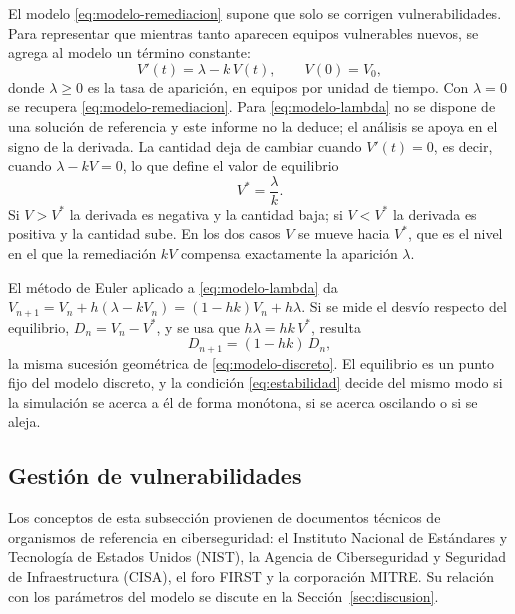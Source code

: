 El modelo \eqref{eq:modelo-remediacion} supone que solo se corrigen vulnerabilidades. Para
representar que mientras tanto aparecen equipos vulnerables nuevos, se agrega al modelo un
término constante:
\begin{equation}
  V'(t) = \lambda - k\, V(t), \qquad V(0) = V_0 ,
  \label{eq:modelo-lambda}
\end{equation}
donde $\lambda \ge 0$ es la tasa de aparición, en equipos por unidad de tiempo. Con
$\lambda = 0$ se recupera \eqref{eq:modelo-remediacion}. Para \eqref{eq:modelo-lambda} no se
dispone de una solución de referencia y este informe no la deduce; el análisis se apoya en
el signo de la derivada. La cantidad deja de cambiar cuando $V'(t) = 0$, es decir, cuando
$\lambda - kV = 0$, lo que define el valor de equilibrio
\begin{equation}
  V^{*} = \frac{\lambda}{k} .
  \label{eq:equilibrio}
\end{equation}
Si $V > V^{*}$ la derivada es negativa y la cantidad baja; si $V < V^{*}$ la derivada es positiva
y la cantidad sube. En los dos casos $V$ se mueve hacia $V^{*}$, que es el nivel en el que la
remediación $kV$ compensa exactamente la aparición $\lambda$.

El método de Euler aplicado a \eqref{eq:modelo-lambda} da
$V_{n+1} = V_n + h(\lambda - kV_n) = (1 - hk) V_n + h\lambda$. Si se mide el desvío respecto
del equilibrio, $D_n = V_n - V^{*}$, y se usa que $h\lambda = hk\, V^{*}$, resulta
\begin{equation}
  D_{n+1} = (1 - hk)\, D_n ,
  \label{eq:desvio-equilibrio}
\end{equation}
la misma sucesión geométrica de \eqref{eq:modelo-discreto}. El equilibrio es un punto fijo del
modelo discreto, y la condición \eqref{eq:estabilidad} decide del mismo modo si la simulación se
acerca a él de forma monótona, si se acerca oscilando o si se aleja.

\subsection{Gestión de vulnerabilidades}
\label{subsec:gestion-vulnerabilidades}

Los conceptos de esta subsección provienen de documentos técnicos de organismos de referencia en
ciberseguridad: el Instituto Nacional de Estándares y Tecnología de Estados Unidos (NIST), la
Agencia de Ciberseguridad y Seguridad de Infraestructura (CISA), el foro FIRST y la corporación
MITRE. Su relación con los parámetros del modelo se discute en la
Sección~\ref{sec:discusion}.

